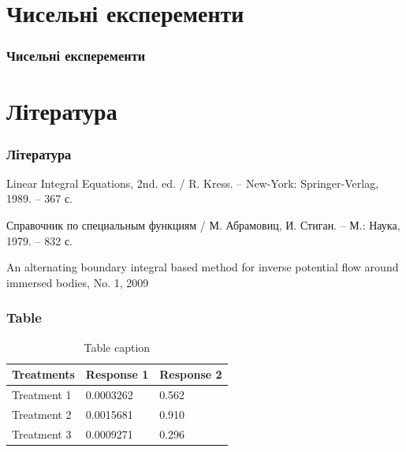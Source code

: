 \documentclass{beamer}
\numberwithin{equation}{section}
\begin{document}

	\section{Чисельні експеременти} 

	\begin{frame}
		\frametitle{Чисельні експеременти}
	\end{frame}
	
	
\section*{Література}
\begin{frame}
	\thispagestyle{empty}
	\frametitle{Література}
	\begin{thebibliography}{99}
		

		Linear Integral Equations, 2nd. ed. / R. Kress. -- 
		New-York: Springer-Verlag, 1989. -- 367 с.

		Справочник по специальным функциям / М. Абрамовиц, И. Стиган. 
		-- М.: Наука, 1979. -- 832 с.
		
		An alternating boundary integral based method for inverse potential flow around immersed bodies, No. 1, 2009
		
	\end{thebibliography}
\end{frame}

	
	
	\begin{frame}

		\frametitle{Table}
		\begin{table}
			\begin{tabular}{l l l}
				\toprule
				\textbf{Treatments} & \textbf{Response 1} & \textbf{Response 2}\\
				\midrule
				Treatment 1 & 0.0003262 & 0.562 \\
				Treatment 2 & 0.0015681 & 0.910 \\
				Treatment 3 & 0.0009271 & 0.296 \\
				\bottomrule
			\end{tabular}
			\caption{Table caption}
		\end{table}
	\end{frame}
	
	
\end{document}
